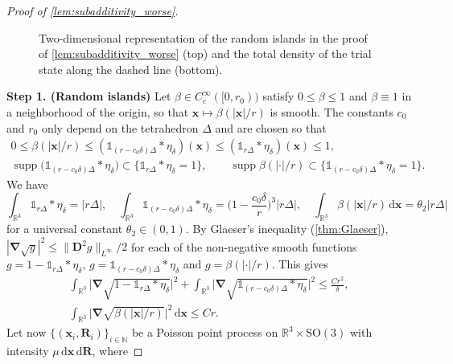 \documentclass[final,reqno]{amsart}
\theoremstyle{remark}
\renewcommand{\le}{\leqslant}
\DeclareMathOperator{\supp}{supp}
\newcommand{\RR}{\mathbb{R}}
\newcommand{\NN}{\mathbb{N}}
\newcommand{\SO}{\mathrm{SO}}
\newcommand{\iden}{\mathbb{1}}
\newcommand{\grad}{\bm{\nabla}}
\newcommand{\tetra}{\mathbb{\Delta}}
\newcommand{\dd}{\mathrm{d}}
\begin{document}
\begin{proof}[Proof of \cref{lem:subadditivity_worse}]
\begin{figure}[t]
\caption{Two-dimensional representation of the random islands in the proof of \cref{lem:subadditivity_worse} (top) and the total density of the trial state along the dashed line (bottom).}\label{fig:islands}
\end{figure}

\medskip

\noindent\textbf{Step 1. (Random islands)} Let $\beta\in C^\infty_c([0,r_0))$ satisfy $0\le\beta\le1$ and $\beta\equiv1$ in a neighborhood of the origin, so that $\mathbf{x}\mapsto\beta(|\mathbf{x}|/r)$ is smooth. The constants $c_0$ and $r_0$ only depend on the tetrahedron $\tetra$ and are chosen so that
\begin{gather*}
0\le\beta(|\mathbf{x}|/r)\le(\iden_{(r-c_0\delta)\tetra}\ast\eta_\delta)(\mathbf{x})\le(\iden_{r\tetra}\ast\eta_\delta)(\mathbf{x})\le1,\\
\supp\big(\iden_{(r-c_0\delta)\tetra}\ast\eta_\delta\big)\subset\big\{\iden_{r\tetra}\ast\eta_\delta=1\big\},\qquad\supp\beta(|\cdot|/r)\subset\big\{\iden_{(r-c_0\delta)\tetra}\ast\eta_\delta=1\big\}.
\end{gather*}
We have
$$
\int_{\RR^3}\iden_{r\tetra}\ast\eta_\delta=|r\tetra|,\quad\int_{\RR^3}\iden_{(r-c_0\delta)\tetra}\ast\eta_\delta=\Big(1-\frac{c_0\delta}{r}\Big)^3|r\tetra|,\quad\int_{\RR^3}\beta(|\mathbf{x}|/r)\,\dd\mathbf{x}=\theta_2|r\tetra|
$$
for a universal constant $\theta_2\in(0,1)$. By Glaeser's inequality (\cref{thm:Glaeser}), $|\grad\sqrt{g}|^2\le\|\mathbf{D}^2g\|_{L^\infty}/2$ for each of the non-negative smooth functions $g=1-\iden_{r\tetra}\ast\eta_\delta$, $g=\iden_{(r-c_0\delta)\tetra}\ast\eta_\delta$ and $g=\beta(|\cdot|/r)$. This gives
\begin{multline}\label{eq:gradients_islands}
\int_{\RR^3}\big|\grad\sqrt{1-\iden_{r\tetra}\ast\eta_\delta}\big|^2+\int_{\RR^3}\big|\grad\sqrt{\iden_{(r-c_0\delta)\tetra}\ast\eta_\delta}\big|^2\le\frac{Cr^2}{\delta},\\
\int_{\RR^3}\big|\grad\sqrt{\beta(|\mathbf{x}|/r)}\big|^2\,\dd\mathbf{x}\le Cr.
\end{multline}
Let now $\{(\mathbf{x}_i,\mathbf{R}_i)\}_{i\in\NN}$ be a Poisson point process on $\RR^3\times \SO(3)$ with intensity $\mu\,\dd \mathbf{x}\,\dd \mathbf{R}$, where

\end{proof}
\end{document}
